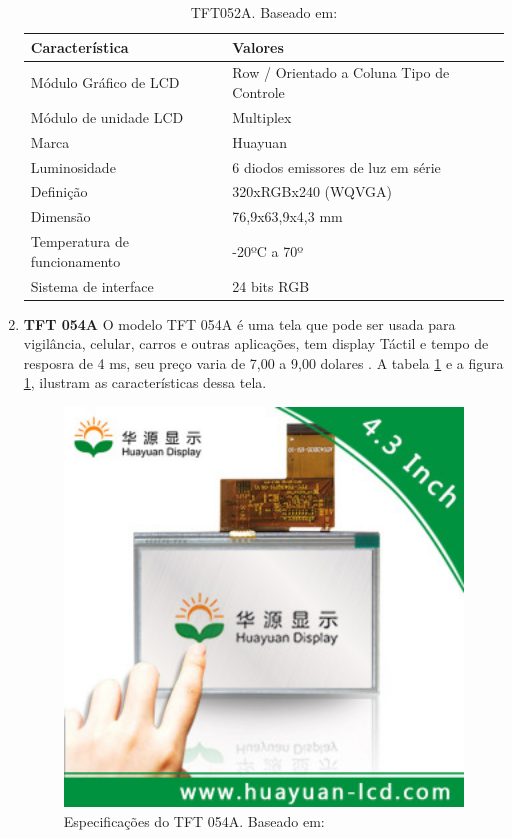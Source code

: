 \begin{enumerate}
\begin{table}[ht]
\caption{TFT052A. Baseado em: \cite{tela_resistiva}}
\centering
\begin{tabular}{| l |  p{10cm} |}
\hline
Característica & Valores \\
\hline
Módulo Gráfico de LCD & Row / Orientado a Coluna Tipo de Controle \\
\hline
Módulo de unidade LCD & Multiplex \\
\hline
Marca & Huayuan \\
\hline
Luminosidade & 6 diodos emissores de luz em série \\
\hline
Definição & 320xRGBx240 (WQVGA) \\
\hline
Dimensão & 76,9x63,9x4,3 mm \\
\hline
Temperatura de funcionamento & -20ºC a 70º\\
\hline
Sistema de interface & 24 bits RGB \\
\hline
\end{tabular}
\label{table:table_tela_resistiva}
\end{table}

\item \textbf{TFT 054A}
O modelo TFT 054A é uma tela que pode ser usada para vigilância, celular,
carros e outras aplicações, tem display Táctil e tempo de resposra de 4 ms,
seu preço varia de 7,00 a 9,00 dolares \cite{tft}. A tabela \ref{table:table_tela_resistiva} e a figura
\ref{fig:imagem_interface2}, ilustram
as características dessa tela.

\begin{figure}[h]
  \centering
  \includegraphics[width=400px, scale=1]{figuras/imagem_interface2}
  \caption{Especificações do TFT 054A. Baseado em: \cite{tft}}
\label{fig:imagem_interface2}
\end{figure}


\end{enumerate}
